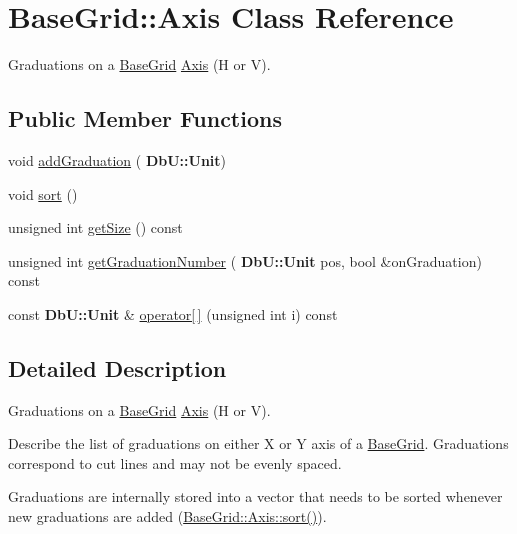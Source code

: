 \hypertarget{classKatabatic_1_1BaseGrid_1_1Axis}{}\section{Base\+Grid\+:\+:Axis Class Reference}
\label{classKatabatic_1_1BaseGrid_1_1Axis}


Graduations on a \mbox{\hyperlink{classKatabatic_1_1BaseGrid}{Base\+Grid}} \mbox{\hyperlink{classKatabatic_1_1BaseGrid_1_1Axis}{Axis}} (H or V).  


\subsection*{Public Member Functions}
\begin{DoxyCompactItemize}
\item 
void \mbox{\hyperlink{classKatabatic_1_1BaseGrid_1_1Axis_ada526136545060f41e8b9228ce1c5895}{add\+Graduation}} (\textbf{ Db\+U\+::\+Unit})
\item 
void \mbox{\hyperlink{classKatabatic_1_1BaseGrid_1_1Axis_a47fdc9eea42b6975cdc835bb2e08810e}{sort}} ()
\item 
unsigned int \mbox{\hyperlink{classKatabatic_1_1BaseGrid_1_1Axis_a9be1e4285daa77fe397767c097fbdc66}{get\+Size}} () const
\item 
unsigned int \mbox{\hyperlink{classKatabatic_1_1BaseGrid_1_1Axis_a2a6bd524227130d8ccf482aa2c484a42}{get\+Graduation\+Number}} (\textbf{ Db\+U\+::\+Unit} pos, bool \&on\+Graduation) const
\item 
const \textbf{ Db\+U\+::\+Unit} \& \mbox{\hyperlink{classKatabatic_1_1BaseGrid_1_1Axis_a074a4f61306b88baac6bbf54b0b3212c}{operator\mbox{[}$\,$\mbox{]}}} (unsigned int i) const
\end{DoxyCompactItemize}


\subsection{Detailed Description}
Graduations on a \mbox{\hyperlink{classKatabatic_1_1BaseGrid}{Base\+Grid}} \mbox{\hyperlink{classKatabatic_1_1BaseGrid_1_1Axis}{Axis}} (H or V). 

Describe the list of graduations on either X or Y axis of a \mbox{\hyperlink{classKatabatic_1_1BaseGrid}{Base\+Grid}}. Graduations correspond to cut lines and may not be evenly spaced.

Graduations are internally stored into a vector that needs to be sorted whenever new graduations are added (\mbox{\hyperlink{classKatabatic_1_1BaseGrid_1_1Axis_a47fdc9eea42b6975cdc835bb2e08810e}{Base\+Grid\+::\+Axis\+::sort()}}). 

